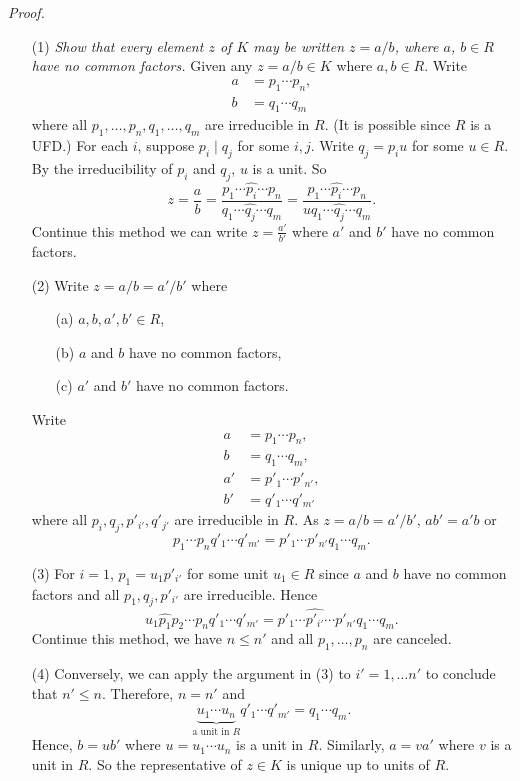 \documentclass{article}
\begin{document}
\emph{Proof.}
\begin{enumerate}
\item[(1)]
  \emph{Show that every element $z$ of $K$ may be written $z=a/b$,
  where $a$, $b\in R$ have no common factors.}
  Given any $z = a/b \in K$ where $a, b\in R$.
  Write
  \begin{align*}
    a &= p_1 \cdots p_n, \\
    b &= q_1 \cdots q_m
  \end{align*}
  where all $p_1, \ldots, p_n, q_1, \ldots, q_m$ are irreducible in $R$.
  (It is possible since $R$ is a UFD.)
  For each $i$, suppose $p_i \mid q_j$ for some $i, j$.
  Write $q_j = p_i u$ for some $u \in R$.
  By the irreducibility of $p_i$ and $q_j$, $u$ is a unit.
  So
  \[
    z
    = \frac{a}{b}
    = \frac{p_1 \cdots \widehat{p_i} \cdots p_n}{q_1 \cdots \widehat{q_j} \cdots q_m}
    = \frac{p_1 \cdots \widehat{p_i} \cdots p_n}{u q_1 \cdots \widehat{q_j} \cdots q_m}.
  \]
  Continue this method we can write $z = \frac{a'}{b'}$ where $a'$ and $b'$ have no common factors.

\item[(2)]
  Write $z = a/b = a'/b'$ where
  \begin{enumerate}
  \item[(a)]
    $a, b, a', b' \in R$,

  \item[(b)]
    $a$ and $b$ have no common factors,

  \item[(c)]
    $a'$ and $b'$ have no common factors.
  \end{enumerate}
  Write
  \begin{align*}
    a &= p_1 \cdots p_n, \\
    b &= q_1 \cdots q_m, \\
    a' &= p'_1 \cdots p'_{n'}, \\
    b' &= q'_1 \cdots q'_{m'}
  \end{align*}
  where all $p_i, q_j, p'_{i'}, q'_{j'}$ are irreducible in $R$.
  As $z = a/b = a'/b'$, $ab' = a'b$ or
  \[
    p_1 \cdots p_n q'_1 \cdots q'_{m'}
    = p'_1 \cdots p'_{n'} q_1 \cdots q_m.
  \]

\item[(3)]
  For $i = 1$, $p_1 = u_1 p'_{i'}$ for some unit $u_1 \in R$
  since $a$ and $b$ have no common factors and all $p_1, q_j, p'_{i'}$ are irreducible.
  Hence
  \[
    u_1 \widehat{p_1} p_2 \cdots p_n q'_1 \cdots q'_{m'}
    = p'_1 \cdots \widehat{p'_{i'}} \cdots p'_{n'} q_1 \cdots q_m.
  \]
  Continue this method,
  we have $n \leq n'$ and all $p_1, \ldots, p_n$ are canceled.

\item[(4)]
  Conversely, we can apply the argument in (3) to $i' = 1, \ldots n'$ to conclude that $n' \leq n$.
  Therefore, $n = n'$ and
  \[
    \underbrace{u_1 \cdots u_n}_{\text{a unit in $R$}} q'_1 \cdots q'_{m'} = q_1 \cdots q_m.
  \]
  Hence, $b = ub'$ where $u = u_1 \cdots u_n$ is a unit in $R$.
  Similarly, $a = va'$ where $v$ is a unit in $R$.
  So the representative of $z \in K$ is unique up to units of $R$.
\end{enumerate}
\end{document}
